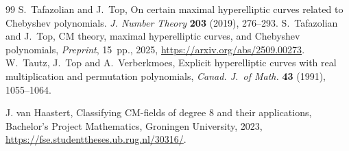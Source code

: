 \documentclass[a4paper,12pt]{amsart}
\numberwithin{equation}{section}
\theoremstyle{plain}
\numberwithin{thm}{section}
\begin{document}
\begin{thebibliography}{99}
    S.~Tafazolian and J.~Top, On certain maximal hyperelliptic curves related to Chebyshev polynomials. \textit{J. Number Theory} \textbf{203} (2019), 276--293. 
 S.~Tafazolian and J.~Top, CM theory, maximal hyperelliptic curves, and Chebyshev polynomials,
\textit{Preprint}, 15~pp., 2025, \url{https://arxiv.org/abs/2509.00273}.
 W.~Tautz, J.~Top and A.~Verberkmoes,
Explicit hyperelliptic curves with real multiplication
 and permutation polynomials,
 \textit{Canad. J.\ of Math.} \textbf{43} (1991),
 1055--1064.

  J.  van Haastert, Classifying CM-fields of degree
8 and their applications, Bachelor's Project Mathematics, Groningen University, 2023, \url{https://fse.studenttheses.ub.rug.nl/30316/}.
\end{thebibliography}
\end{document}
